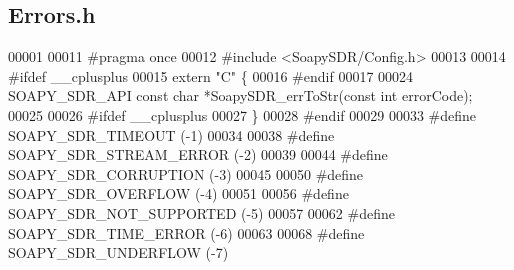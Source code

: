 \subsection{Errors.\+h}
\label{Errors_8h_source}

\begin{DoxyCode}
00001 
00011 \textcolor{preprocessor}{#pragma once}
00012 \textcolor{preprocessor}{#include <SoapySDR/Config.h>}
00013 
00014 \textcolor{preprocessor}{#ifdef \_\_cplusplus}
00015 \textcolor{keyword}{extern} \textcolor{stringliteral}{"C"} \{
00016 \textcolor{preprocessor}{#endif}
00017 
00024 SOAPY_SDR_API \textcolor{keyword}{const} \textcolor{keywordtype}{char} *SoapySDR_errToStr(\textcolor{keyword}{const} \textcolor{keywordtype}{int} errorCode);
00025 
00026 \textcolor{preprocessor}{#ifdef \_\_cplusplus}
00027 \}
00028 \textcolor{preprocessor}{#endif}
00029 
00033 \textcolor{preprocessor}{#define SOAPY\_SDR\_TIMEOUT (-1)}
00034 
00038 \textcolor{preprocessor}{#define SOAPY\_SDR\_STREAM\_ERROR (-2)}
00039 
00044 \textcolor{preprocessor}{#define SOAPY\_SDR\_CORRUPTION (-3)}
00045 
00050 \textcolor{preprocessor}{#define SOAPY\_SDR\_OVERFLOW (-4)}
00051 
00056 \textcolor{preprocessor}{#define SOAPY\_SDR\_NOT\_SUPPORTED (-5)}
00057 
00062 \textcolor{preprocessor}{#define SOAPY\_SDR\_TIME\_ERROR (-6)}
00063 
00068 \textcolor{preprocessor}{#define SOAPY\_SDR\_UNDERFLOW (-7)}
\end{DoxyCode}
